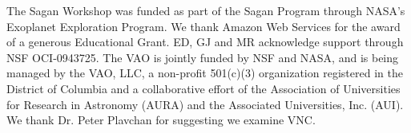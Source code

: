 \acknowledgements The Sagan Workshop was funded as part of the Sagan Program through NASA's Exoplanet Exploration Program. We thank Amazon Web Services for the award of a generous Educational Grant. ED, GJ and MR acknowledge support through NSF OCI-0943725. The VAO is jointly funded by NSF and NASA, and is being managed by the VAO, LLC, a non-profit 501(c)(3) organization registered in the District of Columbia and a collaborative effort of the Association of Universities for Research in Astronomy (AURA) and the Associated Universities, Inc. (AUI). We thank Dr. Peter Plavchan for suggesting we examine VNC.
